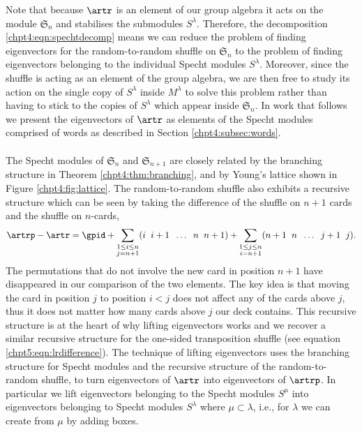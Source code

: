 \documentclass[11pt]{report}
\begin{document}
Note that because $\artr$ is an element of our group algebra it acts on the module $\mathfrak{S}_{n}$ and stabilises the  submodules $S^{\lambda}$. 
Therefore, the decomposition \eqref{chpt4:eqn:spechtdecomp} means we can reduce the problem of 
finding 
eigenvectors for the random-to-random shuffle on $\mathfrak{S}_{n}$ to the 
problem of finding eigenvectors belonging to the individual Specht modules 
$S^\lambda$.
Moreover, since the shuffle is acting as an element of the group algebra, 
we are then free to study its action on the single copy of $S^\lambda$ 
inside $M^\lambda$ to solve this problem rather than having to 
stick to the copies of $S^\lambda$ which appear inside $\mathfrak{S}_{n}$. 
In work that follows we present the eigenvectors of $\artr$ as 
elements of the Specht modules comprised of words as described in Section \ref{chpt4:subsec:words}. 


\paragraph{}
The Specht modules of $\mathfrak{S}_{n}$ and $\mathfrak{S}_{n+1}$ are closely related by the branching structure in Theorem \ref{chpt4:thm:branching}, and by Young's lattice shown in Figure \ref{chpt4:fig:lattice}. The random-to-random shuffle also exhibits a recursive structure which can be seen by taking the difference of the shuffle on $n+1$ cards and the shuffle on $n$-cards,
\begin{eqnarray*}
	\artrp - \artr = \gpid + \sum_{\substack{1\leq i \leq n \\ j=n+1}} (i \hspace{0.2cm} i+1 \hspace{0.2cm} 
	\dots 
	\hspace{0.2cm} n \hspace{0.2cm} n+1) + \sum_{\substack{1\leq j \leq n \\ i=n+1}}	 (n+1 \hspace{0.2cm} n \hspace{0.2cm} \dots 
	\hspace{0.2cm} j+1 \hspace{0.2cm} j) .
\end{eqnarray*}
The permutations that do not involve the new card in position $n+1$ have disappeared in our comparison of the two elements. The key idea is that moving the card in position $j$ to position $i<j$ does not affect any of the cards above $j$, thus it does not matter how many cards above $j$ our deck contains. This recursive structure is at the heart of why lifting eigenvectors works and we recover a similar recursive structure for the one-sided transposition shuffle (see equation \eqref{chpt5:eqn:lrdifference}). The technique of lifting eigenvectors uses the branching structure for Specht modules and the recursive structure of the random-to-random shuffle, to turn eigenvectors of $\artr$ into eigenvectors of $\artrp$. In particular we lift eigenvectors belonging to the Specht modules $S^{\mu}$ into eigenvectors belonging to Specht modules $S^{\lambda}$ where $\mu \subset \lambda$, i.e., for $\lambda$ we can create from $\mu$ by adding boxes. 
\end{document}

